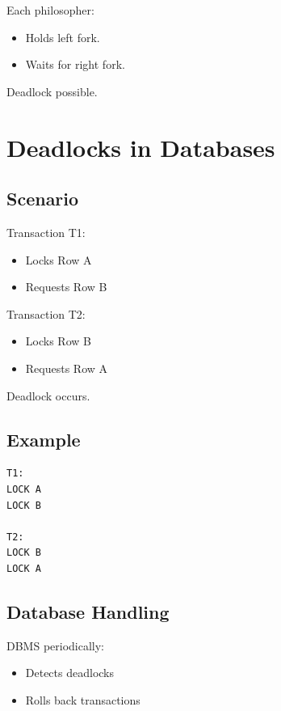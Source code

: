 Each philosopher:

\begin{itemize}
\item Holds left fork.
\item Waits for right fork.
\end{itemize}

Deadlock possible.

\section{Deadlocks in Databases}

\subsection{Scenario}

Transaction T1:

\begin{itemize}
\item Locks Row A
\item Requests Row B
\end{itemize}

Transaction T2:

\begin{itemize}
\item Locks Row B
\item Requests Row A
\end{itemize}

Deadlock occurs.

\subsection{Example}

\begin{verbatim}
T1:
LOCK A
LOCK B

T2:
LOCK B
LOCK A
\end{verbatim}

\subsection{Database Handling}

DBMS periodically:

\begin{itemize}
\item Detects deadlocks
\item Rolls back transactions
\end{itemize}

